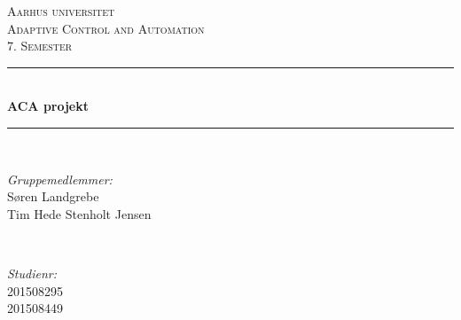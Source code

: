 


	\begin{titlepage}
	
	
	
	\newcommand{\HRule}{\rule{\linewidth}{0.5mm}} %
	\setlength{\topmargin}{0in}
	\centering %
	
	\textsc{\LARGE Aarhus universitet}\\[1.5cm] %
	\textsc{\Large Adaptive Control and Automation}\\[0.5cm] %
	\textsc{\large 7. Semester}\\[0.5cm] %
	
	
	\HRule \\[0.4cm]
	{ \huge \bfseries ACA projekt}\\ %
	\HRule \\[1cm]
	
	
	\begin{minipage}{0.4\textwidth}
		\begin{flushleft} \large
			\emph{Gruppemedlemmer:}\\
			Søren Landgrebe \\
			Tim Hede Stenholt Jensen \\
		\end{flushleft}
	\end{minipage}
	~
	\begin{minipage}{0.4\textwidth}
		\begin{flushright} \large
			\emph{Studienr:} \\
			201508295\\
			201508449\
		\end{flushright}
	\end{minipage}\\[5cm]
	

\end{titlepage}
